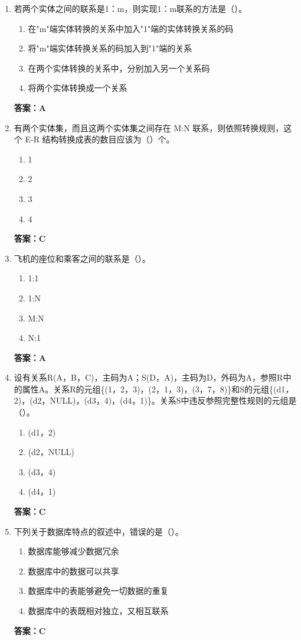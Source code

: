 \documentclass[12pt, a4paper]{article}
\begin{document}
\begin{enumerate}[label=\arabic*.]
	\item 若两个实体之间的联系是1：m，则实现1：m联系的方法是（\quad）。
	      \begin{enumerate}
		      \item 在"m"端实体转换的关系中加入"1"端的实体转换关系的码
		      \item 将"m"端实体转换关系的码加入到"1"端的关系
		      \item 在两个实体转换的关系中，分别加入另一个关系码
		      \item 将两个实体转换成一个关系
	      \end{enumerate}
	      \textbf{答案：A}

	\item 有两个实体集，而且这两个实体集之间存在 M:N 联系，则依照转换规则，这个 E-R 结构转换成表的数目应该为（\quad）个。
	      \begin{enumerate}
		      \item 1
		      \item 2
		      \item 3
		      \item 4
	      \end{enumerate}
	      \textbf{答案：C}

	\item 飞机的座位和乘客之间的联系是（\quad）。
	      \begin{enumerate}
		      \item 1:1
		      \item 1:N
		      \item M:N
		      \item N:1
	      \end{enumerate}
	      \textbf{答案：A}

	\item 设有关系R(A，B，C)，主码为A；S(D，A)，主码为D，外码为A，参照R中的属性A。关系R的元组\{(1，2，3)，(2，1，3)，(3，7，8)\}和S的元组\{(d1，2)，(d2，NULL)，(d3，4)，(d4，1)\}。关系S中违反参照完整性规则的元组是（\quad）。
	      \begin{enumerate}
		      \item (d1，2)
		      \item (d2，NULL)
		      \item (d3，4)
		      \item (d4，1)
	      \end{enumerate}
	      \textbf{答案：C}

	\item 下列关于数据库特点的叙述中，错误的是（\quad）。
	      \begin{enumerate}
		      \item 数据库能够减少数据冗余
		      \item 数据库中的数据可以共享
		      \item 数据库中的表能够避免一切数据的重复
		      \item 数据库中的表既相对独立，又相互联系
	      \end{enumerate}
	      \textbf{答案：C}
\end{enumerate}
\end{document}
